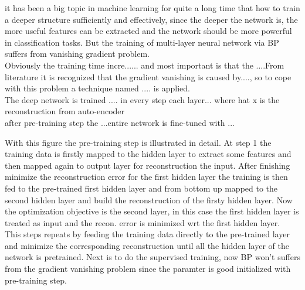\begin{frame}
 it has been a big topic in machine learning for quite a long time that how to train a deeper structure sufficiently and effectively, since the deeper the network is, the more useful features can be extracted and the network should be more powerful in classification tasks. But the training of multi-layer neural network via BP suffers from vanishing gradient problem. \\
 Obviously the training time incre...... and most important is that the ....From literature it is recognized that the gradient vanishing is caused by...., so to cope with this problem a technique named .... is applied. \\
 The deep network is trained .... in every step each layer... where hat x is the reconstruction from auto-encoder\\
 after pre-training step the ...entire network is fine-tuned with ...
\end{frame}

\begin{frame}
 With this figure the pre-training step is illustrated in detail. At step 1 the training data is firstly mapped to the hidden layer to extract some features and then mapped again to output layer for reconstruction the input.  After finishing minimize the reconstruction error for the first hidden layer the training is then fed to the pre-trained first hidden layer and from bottom up mapped to the second hidden layer and build the reconstruction of the firsty hidden layer. Now the optimization objective is the second layer, in this case the first hidden layer is treated as input and the recon. error is minimized wrt the first hidden layer. \\
 This steps repeats by feeding the training data directly to the pre-trained layer and minimize the corresponding reconstruction until all the hidden layer of the network is pretrained. Next is to do the supervised training, now BP won't suffers from the gradient vanishing problem since the paramter is good initialized with pre-training step.
\end{frame}

